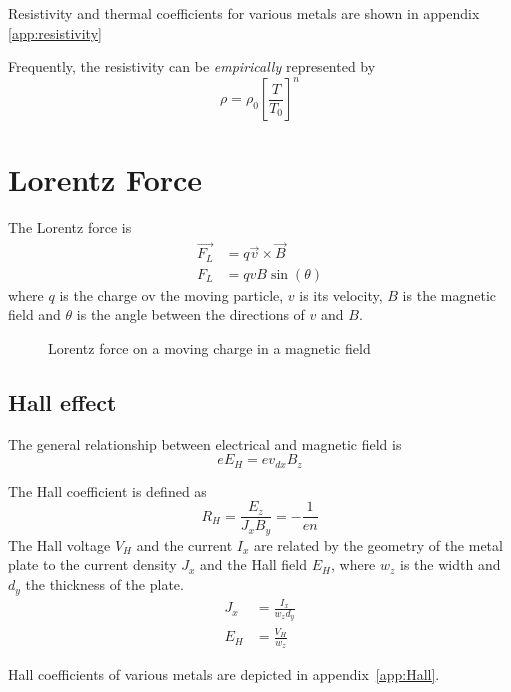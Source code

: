 Resistivity and thermal coefficients for various metals are shown in appendix \ref{app:resistivity}

Frequently, the resistivity can be \emph{empirically} represented by
\begin{equation}
    \rho = \rho_0 \left[ \frac{T}{T_0} \right]^n
\end{equation}

\section{Lorentz Force}

The Lorentz force is
\begin{align}
    \vec{F_L} &= q \vec{v} \times \vec{B} \\
    F_L &= q v B \sin(\theta)
\end{align}
where $q$ is the charge ov the moving particle, $v$ is its velocity,
$B$ is the magnetic field and $\theta$ is the angle between the directions
of $v$ and $B$.

\begin{figure}[ht!]
    \centering
    
    \caption{Lorentz force on a moving charge in a magnetic field}
\end{figure}

\subsection{Hall effect}

The general relationship between electrical and magnetic field is
\begin{equation}
    e E_H = e v_{dx} B_z
\end{equation}

The Hall coefficient  is defined as
\begin{equation}
    R_H = \frac{E_z}{J_x B_y} = -\frac{1}{en}
\end{equation}
The Hall voltage $V_H$ and the current $I_x$ are related by the geometry of the metal plate to the current density $J_x$ and the Hall field $E_H$, where $w_z$ is the width and $d_y$ the thickness of the plate.
\begin{align}
    J_x &= \frac{I_x}{w_z d_y} \\
    E_H &= \frac{V_H}{w_z}
\end{align}

Hall coefficients of various metals are depicted in appendix~\ref{app:Hall}.

